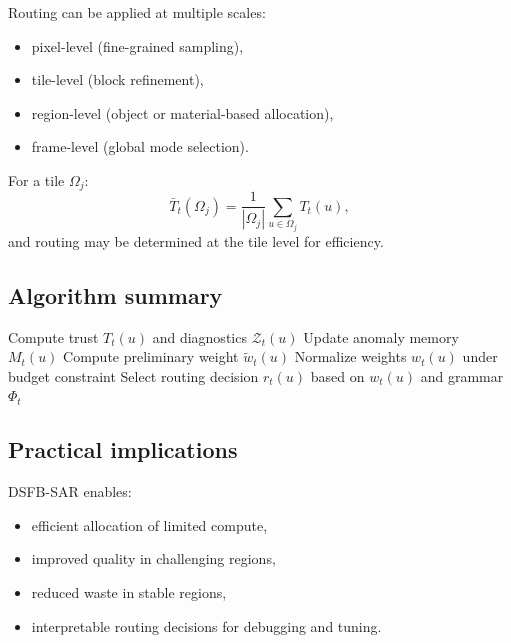 \documentclass[11pt]{article}
\theoremstyle{definition}
\theoremstyle{plain}
\begin{document}
Routing can be applied at multiple scales:
\begin{itemize}[leftmargin=1.5em]
    \item pixel-level (fine-grained sampling),
    \item tile-level (block refinement),
    \item region-level (object or material-based allocation),
    \item frame-level (global mode selection).
\end{itemize}

For a tile $\Omega_j$:
\begin{equation}
\bar{T}_t(\Omega_j)=\frac{1}{|\Omega_j|}\sum_{u\in\Omega_j} T_t(u),
\end{equation}
and routing may be determined at the tile level for efficiency.


\subsection{Algorithm summary}

\begin{algorithm}[H]
\caption{DSFB-SAR Structural Adaptive Routing}
\begin{algorithmic}[1]
    \State Compute trust $T_t(u)$ and diagnostics $\mathcal{Z}_t(u)$
    \State Update anomaly memory $M_t(u)$
    \State Compute preliminary weight $\tilde{w}_t(u)$
\EndFor
\State Normalize weights $w_t(u)$ under budget constraint
    \State Select routing decision $r_t(u)$ based on $w_t(u)$ and grammar $\Phi_t$
\EndFor
\end{algorithmic}
\end{algorithm}


\subsection{Practical implications}

DSFB-SAR enables:
\begin{itemize}[leftmargin=1.5em]
    \item efficient allocation of limited compute,
    \item improved quality in challenging regions,
    \item reduced waste in stable regions,
    \item interpretable routing decisions for debugging and tuning.
\end{itemize}
\end{document}
